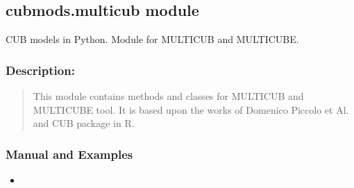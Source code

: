 \documentclass[letterpaper,10pt,english]{sphinxmanual}
\begin{document}
\subsection{cubmods.multicub module}
\label{\detokenize{cubmods:module-cubmods.multicub}}\label{\detokenize{cubmods:cubmods-multicub-module}}\label{\detokenize{cubmods:multicub-module}}
\sphinxAtStartPar
CUB models in Python.
Module for MULTICUB and MULTICUBE.


\subsubsection{Description:}
\label{\detokenize{cubmods:id842}}\begin{quote}

\sphinxAtStartPar
This module contains methods and classes
for MULTICUB and MULTICUBE tool.
It is based upon the works of Domenico
Piccolo et Al. and CUB package in R.
\end{quote}


\subsubsection{Manual and Examples}
\label{\detokenize{cubmods:id843}}\begin{itemize}
\item {} 
\sphinxAtStartPar
{}

\end{itemize}
\end{document}
